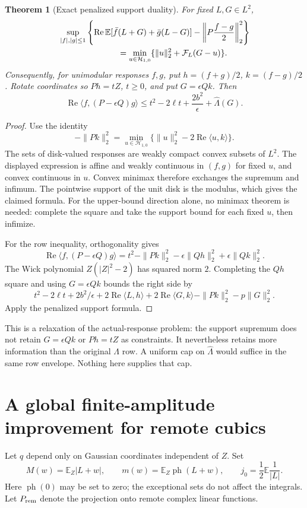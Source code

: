 \documentclass[11pt]{article}
\newtheorem{theorem}{Theorem}
\newcommand{\E}{\mathbb E}
\newcommand{\ph}{\operatorname{ph}}
\newcommand{\Rea}{\operatorname{Re}}
\newcommand{\HH}{\mathcal H}
\begin{document}
\begin{theorem}[Exact penalized support duality]\label{thm:duality}
For fixed $L,G\in L^2$,
\begin{align*}
 &\sup_{|f|,|g|\le1}\left\{
 \Rea\E[\bar f(L+G)+\bar g(L-G)]
 -\left\|P\frac{f-g}{2}\right\|_2^2\right\}\\
 &\hspace{25mm}=\min_{u\in\HH_{1,0}}
 \{\|u\|_2^2+\mathcal F_L(G-u)\}.
\end{align*}
Consequently, for unimodular responses $f,g$, put $h=(f+g)/2$,
$k=(f-g)/2$. Rotate coordinates so $Ph=tZ$, $t\ge0$, and put
$G=\epsilon Qk$. Then
\begin{equation}\label{eq:row}
 \Rea\langle f,(P-\epsilon Q)g\rangle
 \le t^2-2\ell t+\frac{2b^2}{\epsilon}+\widehat\Lambda(G).
\end{equation}
\end{theorem}
\begin{proof}
Use the identity
\[
 -\|Pk\|_2^2
 =\min_{u\in\HH_{1,0}}\{\|u\|_2^2-2\Rea\langle u,k\rangle\}.
\]
The sets of disk-valued responses are weakly compact convex subsets of $L^2$.
The displayed expression is affine and weakly continuous in $(f,g)$ for fixed
$u$, and convex continuous in $u$. Convex minimax therefore exchanges the
supremum and infimum. The pointwise support of the unit disk is the modulus,
which gives the claimed formula. For the upper-bound direction alone, no
minimax theorem is needed: complete the square and take the support bound
for each fixed $u$, then infimize.

For the row inequality, orthogonality gives
\[
 \Rea\langle f,(P-\epsilon Q)g\rangle
 =t^2-\|Pk\|_2^2-\epsilon\|Qh\|_2^2+\epsilon\|Qk\|_2^2.
\]
The Wick polynomial $Z(|Z|^2-2)$ has squared norm $2$. Completing the
$Qh$ square and using $G=\epsilon Qk$ bounds the right side by
\[
 t^2-2\ell t+2b^2/\epsilon
 +2\Rea\langle L,h\rangle+2\Rea\langle G,k\rangle
 -\|Pk\|_2^2-p\|G\|_2^2.
\]
Apply the penalized support formula.
\end{proof}

This is a relaxation of the actual-response problem: the support supremum
does not retain $G=\epsilon Qk$ or $Ph=tZ$ as constraints. It nevertheless
retains more information than the original $\Lambda$ row. A uniform cap on
$\widehat\Lambda$ would suffice in the same row envelope. Nothing here supplies
that cap.

\section{A global finite-amplitude improvement for remote cubics}
Let $q$ depend only on Gaussian coordinates independent of $Z$. Set
\[
 M(w)=\E_Z|L+w|,\qquad m(w)=\E_Z\ph(L+w),\qquad
 j_0=\frac12\E\frac1{|L|}.
\]
Here $\ph(0)$ may be set to zero; the exceptional sets do not affect the integrals.
Let $P_{\rm rem}$ denote the projection onto remote complex linear functions.
\end{document}
